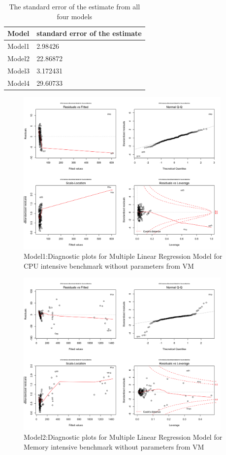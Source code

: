 \documentclass[a4paper,10pt,twoside]{article}
\begin{document}
\begin{table}[ht]
\caption{The standard error of the estimate from all four models}
\begin{center}
    \begin{tabular}{ | l | | p{5cm} | }
    \hline
    Model &  standard error of the estimate \\ \hline
    Model1 & 2.98426 \\ \hline
    Model2 & 22.86872 \\ \hline
    Model3 & 3.172431 \\ \hline
    Model4 & 29.60733 \\ \hline
    \end{tabular}
\end{center}
\label{tab:gt}
\end{table}
\begin{figure}[h]
\centering
\includegraphics[width=400px]{source_model_cpu_intensive_benchmark.png} 
\caption{Model1:Diagnostic plots for Multiple Linear Regression Model for CPU intensive benchmark without parameters from VM}
\end{figure}
\begin{figure}[h]
\centering
\includegraphics[width=400px]{source_model_memory_intensive_benchmkark.png} 
\caption{Model2:Diagnostic plots for  Multiple Linear Regression Model for Memory intensive benchmark without parameters from VM}
\end{figure}
\end{document}
